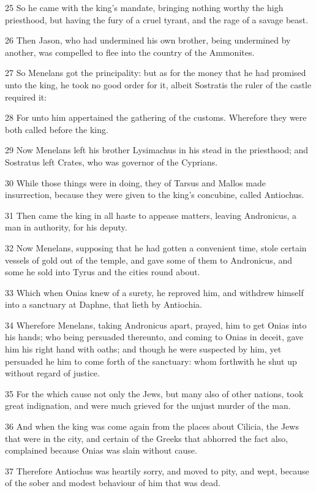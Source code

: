 \par 25 So he came with the king's mandate, bringing nothing worthy the high priesthood, but having the fury of a cruel tyrant, and the rage of a savage beast.
\par 26 Then Jason, who had undermined his own brother, being undermined by another, was compelled to flee into the country of the Ammonites.
\par 27 So Menelans got the principality: but as for the money that he had promised unto the king, he took no good order for it, albeit Sostratis the ruler of the castle required it:
\par 28 For unto him appertained the gathering of the customs. Wherefore they were both called before the king.
\par 29 Now Menelans left his brother Lysimachus in his stead in the priesthood; and Sostratus left Crates, who was governor of the Cyprians.
\par 30 While those things were in doing, they of Tarsus and Mallos made insurrection, because they were given to the king's concubine, called Antiochus.
\par 31 Then came the king in all haste to appease matters, leaving Andronicus, a man in authority, for his deputy.
\par 32 Now Menelans, supposing that he had gotten a convenient time, stole certain vessels of gold out of the temple, and gave some of them to Andronicus, and some he sold into Tyrus and the cities round about.
\par 33 Which when Onias knew of a surety, he reproved him, and withdrew himself into a sanctuary at Daphne, that lieth by Antiochia.
\par 34 Wherefore Menelans, taking Andronicus apart, prayed, him to get Onias into his hands; who being persuaded thereunto, and coming to Onias in deceit, gave him his right hand with oaths; and though he were suspected by him, yet persuaded he him to come forth of the sanctuary: whom forthwith he shut up without regard of justice.
\par 35 For the which cause not only the Jews, but many also of other nations, took great indignation, and were much grieved for the unjust murder of the man.
\par 36 And when the king was come again from the places about Cilicia, the Jews that were in the city, and certain of the Greeks that abhorred the fact also, complained because Onias was slain without cause.
\par 37 Therefore Antiochus was heartily sorry, and moved to pity, and wept, because of the sober and modest behaviour of him that was dead.
